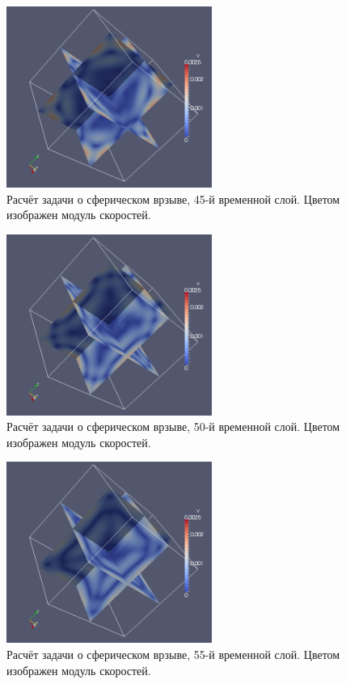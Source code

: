 \begin{figure}[htp]
\centering
\includegraphics[width=0.6\textwidth]{png/spherical-explosion-test/v-scalar/0045.png}
\caption{Расчёт задачи о сферическом врзыве, 45-й временной слой. Цветом изображен модуль скоростей.}
\end{figure}

\begin{figure}[htp]
\centering
\includegraphics[width=0.6\textwidth]{png/spherical-explosion-test/v-scalar/0050.png}
\caption{Расчёт задачи о сферическом врзыве, 50-й временной слой. Цветом изображен модуль скоростей.}
\end{figure}

\begin{figure}[htp]
\centering
\includegraphics[width=0.6\textwidth]{png/spherical-explosion-test/v-scalar/0055.png}
\caption{Расчёт задачи о сферическом врзыве, 55-й временной слой. Цветом изображен модуль скоростей.}
\end{figure}

